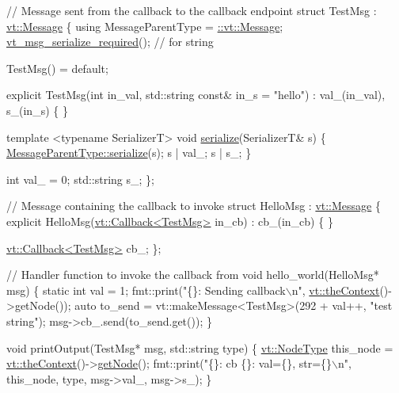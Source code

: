 \begin{DoxyCodeInclude}
\textcolor{comment}{// Message sent from the callback to the callback endpoint}
\textcolor{keyword}{struct }TestMsg : \hyperlink{structvt_1_1messaging_1_1_active_msg}{vt::Message} \{
  \textcolor{keyword}{using} MessageParentType = \hyperlink{namespacevt_a3a3ddfef40b4c90915fa43cdd5f129ea}{::vt::Message};
  \hyperlink{message__serialize_8h_a54128d5338aaa9c918179826085e13d1}{vt\_msg\_serialize\_required}(); \textcolor{comment}{// for string}

  TestMsg() = \textcolor{keywordflow}{default};

  \textcolor{keyword}{explicit} TestMsg(\textcolor{keywordtype}{int} in\_val, std::string \textcolor{keyword}{const}& in\_s = \textcolor{stringliteral}{"hello"})
    : val\_(in\_val),
      s\_(in\_s)
  \{ \}

  \textcolor{keyword}{template} <\textcolor{keyword}{typename} SerializerT>
  \textcolor{keywordtype}{void} \hyperlink{structvt_1_1messaging_1_1_active_msg_a758f02bef5991c48d6c9a56c30ca7ad9}{serialize}(SerializerT& s) \{
    \hyperlink{namespacevt_1_1vrt_1_1collection_1_1balance_a783d95de203cabd0f599440e9869c313}{MessageParentType::serialize}(s);
    s | val\_;
    s | s\_;
  \}

  \textcolor{keywordtype}{int} val\_ = 0;
  std::string s\_;
\};

\textcolor{comment}{// Message containing the callback to invoke}
\textcolor{keyword}{struct }HelloMsg : \hyperlink{structvt_1_1messaging_1_1_active_msg}{vt::Message} \{
  \textcolor{keyword}{explicit} HelloMsg(\hyperlink{structvt_1_1pipe_1_1callback_1_1cbunion_1_1_callback_typed}{vt::Callback<TestMsg>} in\_cb)
    : cb\_(in\_cb)
  \{ \}

  \hyperlink{structvt_1_1pipe_1_1callback_1_1cbunion_1_1_callback_typed}{vt::Callback<TestMsg>} cb\_;
\};

\textcolor{comment}{// Handler function to invoke the callback from}
\textcolor{keywordtype}{void} hello\_world(HelloMsg* msg) \{
  \textcolor{keyword}{static} \textcolor{keywordtype}{int} val = 1;
  fmt::print(\textcolor{stringliteral}{"\{\}: Sending callback\(\backslash\)n"}, \hyperlink{namespacevt_a26551fe0e6e6a1371111df5b12c7e92c}{vt::theContext}()->getNode());
  \textcolor{keyword}{auto} to\_send = vt::makeMessage<TestMsg>(292 + val++, \textcolor{stringliteral}{"test string"});
  msg->cb\_.send(to\_send.get());
\}

\textcolor{keywordtype}{void} printOutput(TestMsg* msg, std::string type) \{
  \hyperlink{namespacevt_a866da9d0efc19c0a1ce79e9e492f47e2}{vt::NodeType} this\_node = \hyperlink{namespacevt_a26551fe0e6e6a1371111df5b12c7e92c}{vt::theContext}()->\hyperlink{structvt_1_1ctx_1_1_context_a0d52c263ce8516546a67443d9a86fa5f}{getNode}();
  fmt::print(\textcolor{stringliteral}{"\{\}: cb \{\}: val=\{\}, str=\{\}\(\backslash\)n"}, this\_node, type, msg->val\_, msg->s\_);
\}


\end{DoxyCodeInclude}
